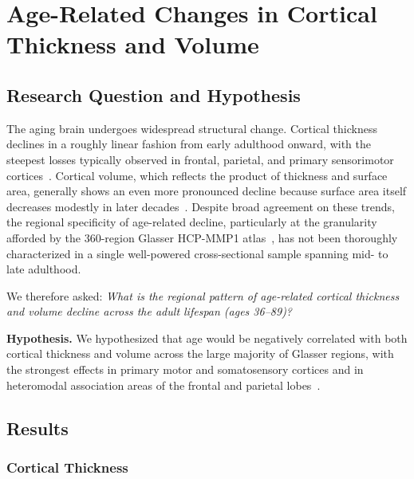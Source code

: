 
\section{Age-Related Changes in Cortical Thickness and Volume}
\label{sec:rq4}

\subsection{Research Question and Hypothesis}

The aging brain undergoes widespread structural change.
Cortical thickness declines in a roughly linear fashion from early adulthood onward, with the steepest losses typically observed in frontal, parietal, and primary sensorimotor cortices~\cite{salat2004thinning, fjell2010structural, hogstrom2013structure}.
Cortical volume, which reflects the product of thickness and surface area, generally shows an even more pronounced decline because surface area itself decreases modestly in later decades~\cite{storsve2014differential, lemaitre2012normal}.
Despite broad agreement on these trends, the regional specificity of age-related decline, particularly at the granularity afforded by the 360-region Glasser HCP-MMP1 atlas~\cite{glasser2016multimodal}, has not been thoroughly characterized in a single well-powered cross-sectional sample spanning mid- to late adulthood.

We therefore asked: \textit{What is the regional pattern of age-related cortical thickness and volume decline across the adult lifespan (ages 36--89)?}

\textbf{Hypothesis.}
We hypothesized that age would be negatively correlated with both cortical thickness and volume across the large majority of Glasser regions, with the strongest effects in primary motor and somatosensory cortices and in heteromodal association areas of the frontal and parietal lobes~\cite{salat2004thinning, raz2005regional}.

\subsection{Results}

\subsubsection{Cortical Thickness}

